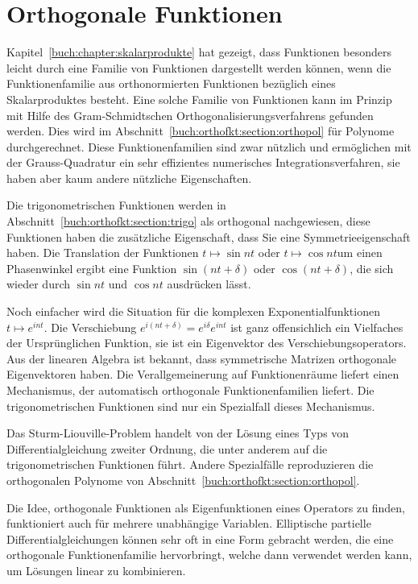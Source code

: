 %
%
%
\chapter{Orthogonale Funktionen
\label{buch:chapter:orthofunkt}}
Kapitel~\ref{buch:chapter:skalarprodukte} hat gezeigt, dass Funktionen
besonders leicht durch eine Familie von Funktionen dargestellt werden 
können, wenn die Funktionenfamilie aus orthonormierten Funktionen
bezüglich eines Skalarproduktes besteht.
Eine solche Familie von Funktionen kann im Prinzip mit Hilfe des
Gram-Schmidtschen Orthogonalisierungsverfahrens gefunden werden.
Dies wird im Abschnitt~\ref{buch:orthofkt:section:orthopol} für
Polynome durchgerechnet.
Diese Funktionenfamilien sind zwar nützlich und ermöglichen mit
der Grauss-Quadratur ein sehr effizientes numerisches
Integrationsverfahren, sie haben aber kaum andere nützliche Eigenschaften.

Die trigonometrischen Funktionen werden in
Abschnitt~\ref{buch:orthofkt:section:trigo} als orthogonal nachgewiesen,
diese Funktionen haben die zusätzliche Eigenschaft, dass Sie eine
Symmetrieeigenschaft haben.
Die Translation der Funktionen $t\mapsto \sin nt$ oder
$t\mapsto\cos nt$um einen Phasenwinkel ergibt eine Funktion
$\sin(nt+\delta)$ oder $\cos(nt+\delta)$, die sich wieder durch
$\sin nt$ und $\cos nt$ ausdrücken lässt.

Noch einfacher wird die Situation für die komplexen Exponentialfunktionen
$t\mapsto e^{int}$.
Die Verschiebung $e^{i(nt+\delta)}=e^{i\delta}e^{int}$ ist ganz
offensichlich ein Vielfaches der Ursprünglichen Funktion, sie ist
ein Eigenvektor des Verschiebungsoperators.
Aus der linearen Algebra ist bekannt, dass symmetrische Matrizen 
orthogonale Eigenvektoren haben.
Die Verallgemeinerung auf Funktionenräume liefert einen Mechanismus,
der automatisch orthogonale Funktionenfamilien liefert.
Die trigonometrischen Funktionen sind nur ein Spezialfall dieses
Mechanismus.

Das Sturm-Liouville-Problem handelt von der Lösung eines Typs
von Differentialgleichung zweiter Ordnung, die unter anderem auf
die trigonometrischen Funktionen führt.
Andere Spezialfälle reproduzieren die orthogonalen Polynome
von Abschnitt~\ref{buch:orthofkt:section:orthopol}.

Die Idee, orthogonale Funktionen als Eigenfunktionen eines
Operators zu finden, funktioniert auch für mehrere unabhängige
Variablen.
Elliptische partielle Differentialgleichungen können sehr oft
in eine Form gebracht werden, die eine orthogonale Funktionenfamilie
hervorbringt, welche dann verwendet werden kann, um Lösungen
linear zu kombinieren.

